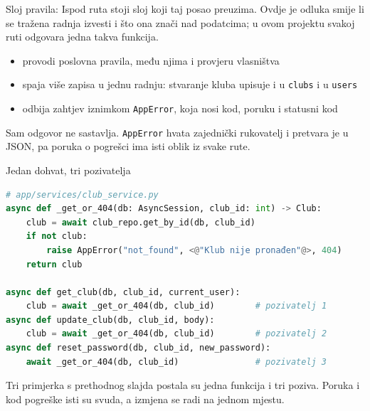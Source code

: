 \begin{frame}{Sloj pravila: }
Ispod ruta stoji sloj koji taj posao preuzima. Ovdje je odluka smije li se tražena radnja izvesti i što ona znači nad podatcima; u ovom projektu svakoj ruti odgovara jedna takva funkcija.

\vspace{0.9em}
\begin{itemize}
  \itemsep0.5em
  \item provodi poslovna pravila, među njima i provjeru vlasništva
  \item spaja više zapisa u jednu radnju: stvaranje kluba upisuje i u \texttt{clubs} i u \texttt{users}
  \item odbija zahtjev iznimkom \texttt{AppError}, koja nosi kod, poruku i statusni kod
\end{itemize}

\vspace{0.9em}
Sam odgovor ne sastavlja. \texttt{AppError} hvata zajednički rukovatelj i pretvara je u JSON, pa poruka o pogrešci ima isti oblik iz svake rute.
\end{frame}

\begin{frame}[fragile]{Jedan dohvat, tri pozivatelja}
\begin{lstlisting}[language=python]
# app/services/club_service.py
async def _get_or_404(db: AsyncSession, club_id: int) -> Club:
    club = await club_repo.get_by_id(db, club_id)
    if not club:
        raise AppError("not_found", <@"Klub nije pronađen"@>, 404)
    return club

async def get_club(db, club_id, current_user):
    club = await _get_or_404(db, club_id)        # pozivatelj 1
async def update_club(db, club_id, body):
    club = await _get_or_404(db, club_id)        # pozivatelj 2
async def reset_password(db, club_id, new_password):
    await _get_or_404(db, club_id)               # pozivatelj 3
\end{lstlisting}

\vspace{0.2em}
Tri primjerka s prethodnog slajda postala su jedna funkcija i tri poziva. Poruka i kod pogreške isti su svuda, a izmjena se radi na jednom mjestu.
\end{frame}

